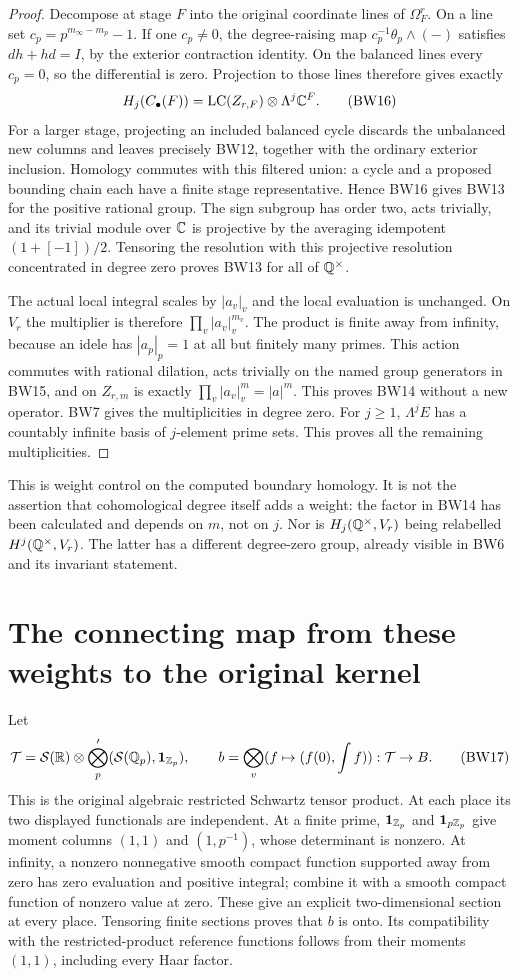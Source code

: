 \begin{proof}
Decompose at stage $F$ into the original coordinate lines of
$\Omega_F^r$. On a line set $c_p=p^{m_\infty-m_p}-1$.
If one $c_p\ne0$, the degree-raising map
$c_p^{-1}\theta_p\wedge(-)$ satisfies $dh+hd=I$, by the
exterior contraction identity. On the balanced lines every $c_p=0$,
so the differential is zero. Projection to those lines therefore
gives exactly
\[
 H_j(C_\bullet(F))=\operatorname{LC}(Z_{r,F})\otimes\Lambda^j\mathbb C^F.
 \tag{BW16}
\]
For a larger stage, projecting an included balanced cycle discards
the unbalanced new columns and leaves precisely BW12, together
with the ordinary exterior inclusion. Homology commutes with this
filtered union: a cycle and a proposed bounding chain each have a
finite stage representative. Hence BW16 gives BW13 for the positive
rational group. The sign subgroup has order two, acts trivially,
and its trivial module over $\mathbb C$ is projective by the averaging
idempotent $(1+[-1])/2$. Tensoring the resolution with this
projective resolution concentrated in degree zero proves BW13 for
all of $\mathbb Q^\times$.

The actual local integral scales by $|a_v|_v$ and the local
evaluation is unchanged. On $V_r$ the multiplier is therefore
$\prod_v|a_v|_v^{m_v}$. The product is finite away from infinity,
because an idele has $|a_p|_p=1$ at all but finitely many primes.
This action commutes with rational dilation, acts trivially on the
named group generators in BW15, and on $Z_{r,m}$ is exactly
$\prod_v|a_v|_v^m=|a|^m$. This proves BW14 without a new operator.
BW7 gives the multiplicities in degree zero. For $j\ge1$,
$\Lambda^jE$ has a countably infinite basis of $j$-element prime
sets. This proves all the remaining multiplicities.
\end{proof}

This is weight control on the computed boundary homology. It is
not the assertion that cohomological degree itself adds a weight:
the factor in BW14 has been calculated and depends on $m$, not on
$j$. Nor is $H_j(\mathbb Q^\times,V_r)$ being relabelled
$H^j(\mathbb Q^\times,V_r)$. The latter has a different degree-zero group,
already visible in BW6 and its invariant statement.

\section{The connecting map from these weights to the original kernel}
Let
\[
 \mathcal T=\mathcal S(\mathbb R)\otimes
       \bigotimes_p'(\mathcal S(\mathbb Q_p),\mathbf1_{\mathbb Z_p}),
 \qquad b=\bigotimes_v(f\mapsto(f(0),\int f)):\mathcal T\to B.
 \tag{BW17}
\]
This is the original algebraic restricted Schwartz tensor product.
At each place its two displayed functionals are independent. At a
finite prime, $\mathbf1_{\mathbb Z_p}$ and $\mathbf1_{p\mathbb Z_p}$ give moment
columns $(1,1)$ and $(1,p^{-1})$, whose determinant is nonzero.
At infinity, a nonzero nonnegative smooth compact function supported
away from zero has zero evaluation and positive integral; combine
it with a smooth compact function of nonzero value at zero. These
give an explicit two-dimensional section at every place. Tensoring
finite sections proves that $b$ is onto. Its compatibility with the
restricted-product reference functions follows from their moments
$(1,1)$, including every Haar factor.

